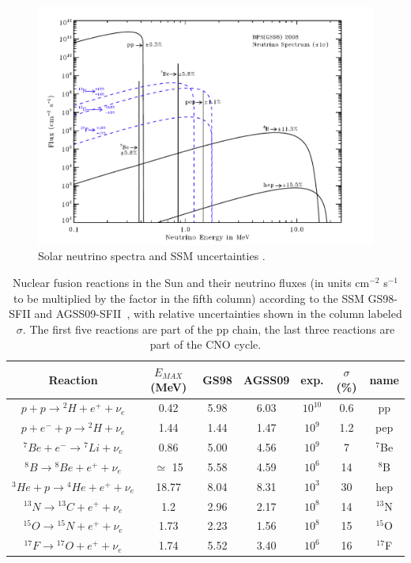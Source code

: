 \begin{figure}[htbp]
\centering
\includegraphics[width=0.6\linewidth]{figures/nu_spectrum1.pdf}
  \caption{
Solar neutrino spectra and SSM uncertainties \cite{serenellif}. 
}
 \label{fig:sol-spectra}
 \end{figure}

\begin{table}
\caption{Nuclear fusion reactions in the Sun and their neutrino fluxes (in units cm$^{-2}$ s$^{-1}$ to be multiplied by the factor in the fifth column) according to the SSM GS98-SFII and AGSS09-SFII~\cite{serenelli}, with relative uncertainties shown in the column labeled $\sigma$. The first five reactions are part of the pp chain, the last three reactions are part of the CNO cycle.}
\centering
\begin{tabular}{|c|c|c|c|c|c|c|}
  \hline
  Reaction & $E_{MAX}$ (MeV) & GS98 & AGSS09& exp. & $\sigma$ (\%) &name \\ 
  \hline
$ p + p \rightarrow {^2}H + e ^+ + \nu_e$ & 0.42 & 5.98  & 6.03   & $10^{10}$ & 0.6 &pp \\
$ p + e^- + p \rightarrow {^2}H  + \nu_e$ & 1.44 & 1.44  &1.47& $10^{9}$  & 1.2 &pep \\
$ {^7}Be + e^- \rightarrow {^7}Li + \nu_e$ & 0.86 & 5.00 & 4.56& $10^{9}$  & 7 &$ {^7}$Be \\
$ {^8}B \rightarrow {^8}Be + e ^+ + \nu_e$ & $\simeq$ 15 & 5.58  &4.59  &  $10^{6}$  & 14 &$ {^8}$B\\
$  {^3}He + p \rightarrow {^4}He + e ^+ + \nu_e$ & 18.77 & 8.04  &8.31 &$10^{3}$  & 30 &hep \\
$ {^{13}}N \rightarrow {^{13}}C + e ^+ + \nu_e$ & 1.2 & 2.96 &2.17    &$10^{8}$  &14  &$ {^{13}}$N\\
$ {^{15}}O \rightarrow {^{15}}N + e ^+ + \nu_e$ & 1.73 & 2.23 &1.56    &$10^{8}$  & 15& $ {^{15}}$O\\
$ {^{17}}F \rightarrow {^{17}}O + e ^+ + \nu_e$ & 1.74 & 5.52  &3.40   &$10^{6}$  & 16 &$ {^{17}}$F\\
  \hline
\end{tabular}
\label{tab:snuflux}
\end{table}


